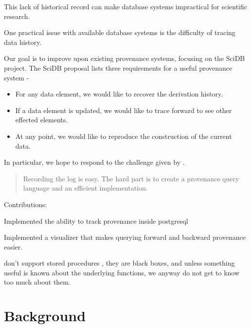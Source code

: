 \documentclass[11pt]{article}
\begin{document}
This lack of historical record can make database systems impractical for scientific research. 

One practical issue with available database systems is the difficulty of tracing data history. 

Our goal is to improve upon existing provenance systems, focusing on the SciDB project. The SciDB proposal \cite{stonebraker9requirements} lists three requirements for a useful provenance system -

\begin{itemize}
\item For any data element, we would like to recover the derivation history. 
\item If a data element is updated, we would like to trace forward to see other effected elements.
\item At any point, we would like to reproduce the construction of the current data. 
\end{itemize}

In particular, we hope to respond to the challenge given by \cite{cudré2009demonstration}.

\begin{quote}
Recording the log is easy. The hard part is to create a provenance query language and an efficient implementation.  
\end{quote}

Contributions:

Implemented the ability to track provenance inside postgresql

Implemented a visualizer that makes querying forward and backward provenance easier.

don't support stored procedures , they are black boxes, and unless something useful is known about the underlying functions, we anyway do not get to know too much about them.

\section{Background}

\end{document}
